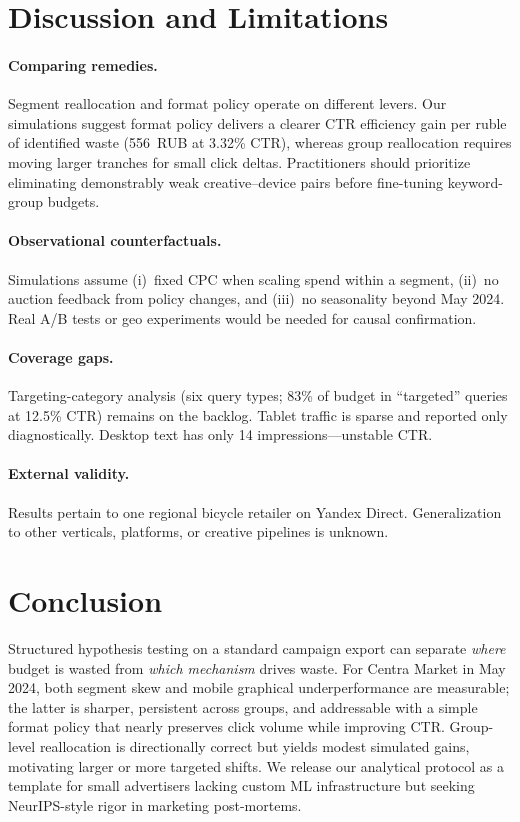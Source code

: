 \documentclass{article}
\begin{document}
\section{Discussion and Limitations}

\paragraph{Comparing remedies.} Segment reallocation and format policy operate on different levers. Our simulations suggest format policy delivers a clearer CTR efficiency gain per ruble of identified waste (556~RUB at 3.32\% CTR), whereas group reallocation requires moving larger tranches for small click deltas. Practitioners should prioritize eliminating demonstrably weak creative--device pairs before fine-tuning keyword-group budgets.

\paragraph{Observational counterfactuals.} Simulations assume (i)~fixed CPC when scaling spend within a segment, (ii)~no auction feedback from policy changes, and (iii)~no seasonality beyond May 2024. Real A/B tests or geo experiments would be needed for causal confirmation.

\paragraph{Coverage gaps.} Targeting-category analysis (six query types; 83\% of budget in ``targeted'' queries at 12.5\% CTR) remains on the backlog. Tablet traffic is sparse and reported only diagnostically. Desktop text has only 14 impressions---unstable CTR.

\paragraph{External validity.} Results pertain to one regional bicycle retailer on Yandex Direct. Generalization to other verticals, platforms, or creative pipelines is unknown.

\section{Conclusion}

Structured hypothesis testing on a standard campaign export can separate \emph{where} budget is wasted from \emph{which mechanism} drives waste. For Centra Market in May 2024, both segment skew and mobile graphical underperformance are measurable; the latter is sharper, persistent across groups, and addressable with a simple format policy that nearly preserves click volume while improving CTR. Group-level reallocation is directionally correct but yields modest simulated gains, motivating larger or more targeted shifts. We release our analytical protocol as a template for small advertisers lacking custom ML infrastructure but seeking NeurIPS-style rigor in marketing post-mortems.
\end{document}
